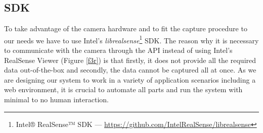 \subsection{SDK}\label{s3.1.3}
To take advantage of the camera hardware and to fit the capture procedure to our needs we have to use Intel's \textit{librealsense}\footnote{Intel® RealSense™ SDK — \url{https://github.com/IntelRealSense/librealsense}} SDK. The reason why it is necessary to communicate with the camera through the API instead of using Intel's RealSense Viewer (Figure \ref{f3r}) is that firstly, it does not provide all the required data out-of-the-box and secondly, the data cannot be captured all at once. As we are designing our system to work in a variety of application scenarios including a web environment, it is crucial to automate all parts and run the system with minimal to no human interaction. \bigskip

